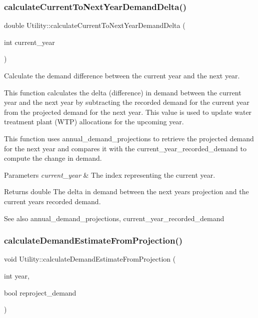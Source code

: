 \subsubsection{\texorpdfstring{calculate\+Current\+To\+Next\+Year\+Demand\+Delta()}{calculateCurrentToNextYearDemandDelta()}}
{\footnotesize\ttfamily double Utility\+::calculate\+Current\+To\+Next\+Year\+Demand\+Delta (\begin{DoxyParamCaption}\item[{int}]{current\+\_\+year }\end{DoxyParamCaption})}



Calculate the demand difference between the current year and the next year. 

This function calculates the delta (difference) in demand between the current year and the next year by subtracting the recorded demand for the current year from the projected demand for the next year. This value is used to update water treatment plant (W\+TP) allocations for the upcoming year.

This function uses annual\+\_\+demand\+\_\+projections to retrieve the projected demand for the next year and compares it with the current\+\_\+year\+\_\+recorded\+\_\+demand to compute the change in demand.


\begin{DoxyParams}{Parameters}
{\em current\+\_\+year} & The index representing the current year.\\
\hline
\end{DoxyParams}
\begin{DoxyReturn}{Returns}
double The delta in demand between the next year\textquotesingle{}s projection and the current year\textquotesingle{}s recorded demand.
\end{DoxyReturn}
\begin{DoxySeeAlso}{See also}
annual\+\_\+demand\+\_\+projections, current\+\_\+year\+\_\+recorded\+\_\+demand 
\end{DoxySeeAlso}
\mbox{\label{classUtility_a10f96b2f34ba7e6e12a8e8fb98b8534a}} 
\subsubsection{\texorpdfstring{calculate\+Demand\+Estimate\+From\+Projection()}{calculateDemandEstimateFromProjection()}}
{\footnotesize\ttfamily void Utility\+::calculate\+Demand\+Estimate\+From\+Projection (\begin{DoxyParamCaption}\item[{int}]{year,  }\item[{bool}]{reproject\+\_\+demand }\end{DoxyParamCaption})}



